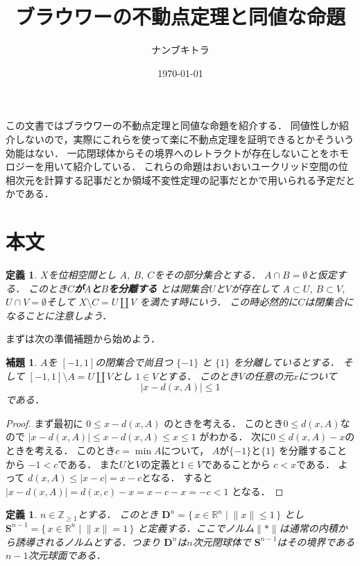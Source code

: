 \documentclass[leqno, a4paper, 12pt]{jsarticle}
\title{
ブラウワーの不動点定理と同値な命題
}
\author{ナンブキトラ}
\date{\today}
\newtheorem{lem}[thm]{補題}
\newtheorem{df}[thm]{定義}
\newcommand{\zz}{\mathbb{Z}}
\newcommand{\rr}{\mathbb{R}}
\newcommand{\mydisc}[1]{\mathbf{D}^{#1}}
\newcommand{\mysphere}[1]{\mathbf{S}^{#1}}
\begin{document}
\maketitle

この文書ではブラウワーの不動点定理と同値な命題を紹介する．
同値性しか紹介しないので，実際にこれらを使って楽に不動点定理を証明できるとかそういう効能はない．
一応閉球体からその境界へのレトラクトが存在しないことをホモロジーを用いて紹介している．
これらの命題はおいおいユークリッド空間の位相次元を計算する記事だとか領域不変性定理の記事だとかで用いられる予定だとかである．

\section{本文}

\begin{df}
$X$を位相空間とし
$A$, $B$, $C$をその部分集合とする．
$A\cap B=\emptyset$と仮定する．
このとき\textbf{$C$が$A$と$B$を分離する}
とは開集合$U$と$V$が存在して
$A\subset U$, $B\subset V$, 
$U\cap V=\emptyset$そして
$X\setminus C=U\coprod V$
を満たす時にいう．
この時必然的に$C$は閉集合になることに注意しよう．
\end{df}

まずは次の準備補題から始めよう．
\begin{lem}\label{lem:kisokiso}
$A$を
$[-1, 1]$の閉集合で尚且つ
$\{-1\}$
と
$\{1\}$
を分離しているとする．
そして
$[-1, 1]\setminus A=U\coprod V$とし
$1\in V$とする．
このとき$V$の任意の元$x$について
\[
|x-d(x, A)|\le 1
\]である．
\end{lem}
\begin{proof}
まず最初に
$0\le x-d(x, A)$
のときを考える．
このとき$0\le d(x, A)$なので
$|x-d(x, A)|\le x-d(x, A)\le x\le 1$
がわかる．
次に$0\le d(x, A)-x$のときを考える．
このとき$c=\min A$について，
$A$が$\{-1\}$と$\{1\}$
を分離することから
$-1<c$である．
また$U$と$V$の定義と$1\in V$であることから
$c<x$である．
よって
$d(x, A)\le |x-c|=x-c$となる．
すると
$|x-d(x, A)|=d(x, c)-x=x-c-x=-c<1$
となる．
\end{proof}


\begin{df}
$n\in \zz_{\ge 1}$とする．
このとき
$\mydisc{n}=\{\, x\in \rr^{n}\mid \lVert x \rVert\le 1\, \}$
とし
$\mysphere{n-1}=\{\, x\in \rr^{n}\mid \lVert x \rVert=1\, \}$
と定義する．ここでノルム$\lVert *\rVert$は通常の内積から誘導されるノルムとする．つまり
$\mydisc{n}$は$n$次元閉球体で
$\mysphere{n-1}$はその境界である$n-1$次元球面である．
\end{df}
\end{document}
